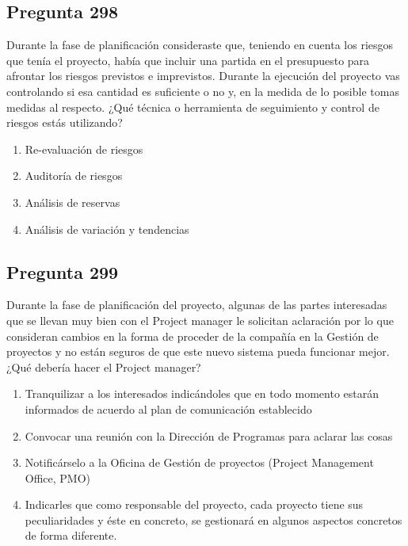 \documentclass[11pt,a4paper]{article}
\begin{document}
\subsection*{Pregunta 298}
Durante la fase de planificación consideraste que, teniendo en cuenta los riesgos que tenía el proyecto, había que incluir una partida en el presupuesto para afrontar los riesgos previstos e imprevistos. Durante la ejecución del proyecto vas controlando si esa cantidad es suficiente o no y, en la medida de lo posible tomas medidas al respecto. ¿Qué técnica o herramienta de seguimiento y control de riesgos estás utilizando?

\begin{enumerate}[label=\alph*)]
  \item Re-evaluación de riesgos
  \item Auditoría de riesgos
  \item Análisis de reservas
  \item Análisis de variación y tendencias
\end{enumerate}

\subsection*{Pregunta 299}
Durante la fase de planificación del proyecto, algunas de las partes interesadas que se llevan muy bien con el Project manager le solicitan aclaración por lo que consideran cambios en la forma de proceder de la compañía en la Gestión de proyectos y no están seguros de que este nuevo sistema pueda funcionar mejor. ¿Qué debería hacer el Project manager?

\begin{enumerate}[label=\alph*)]
  \item Tranquilizar a los interesados indicándoles que en todo momento estarán informados de acuerdo al plan de comunicación establecido
  \item Convocar una reunión con la Dirección de Programas para aclarar las cosas
  \item Notificárselo a la Oficina de Gestión de proyectos (Project Management Office, PMO)
  \item Indicarles que como responsable del proyecto, cada proyecto tiene sus peculiaridades y éste en concreto, se gestionará en algunos aspectos concretos de forma diferente.
\end{enumerate}
\end{document}
